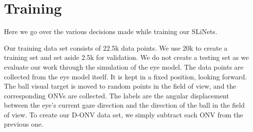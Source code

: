 \documentclass [MS] {UCLAthesis}
\begin{document}
% 
% 

% 



\section{Training}

Here we go over the various decisions made while training our SLiNets.

Our training data set consists of 22.5k data points. We use 20k to create a training set and set aside 2.5k for validation. We do not create a testing set as we evaluate our work through the simulation of the eye model. The data points are collected from the eye model itself. It is kept in a fixed position, looking forward. The ball visual target is moved to random points in the field of view, and the corresponding ONVs are collected. The labels are the angular displacement between the eye's current gaze direction and the direction of the ball in the field of view. To create our D-ONV data set, we simply subtract each ONV from the previous one.
\end{document}
